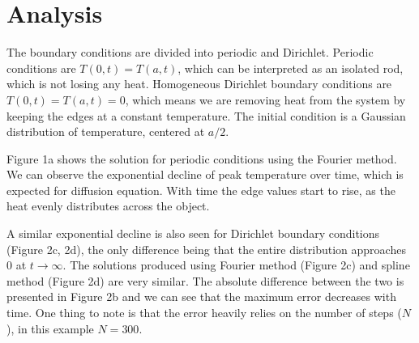\documentclass[12pt, a4paper]{article}
\begin{document}
\section{Analysis}

The boundary conditions are divided into periodic and Dirichlet. Periodic conditions are $T(0,t) = T(a, t)$, which can be interpreted as an isolated rod, which is not losing any heat. Homogeneous Dirichlet boundary conditions are $T(0,t) = T(a, t) = 0$, which means we are removing heat from the system by keeping the edges at a constant temperature. The initial condition is a Gaussian distribution of temperature, centered at $a/2$.

Figure 1a shows the solution for periodic conditions using the Fourier method. We can observe the exponential decline of peak temperature over time, which is expected for diffusion equation. With time the edge values start to rise, as the heat evenly distributes across the object.

A similar exponential decline is also seen for Dirichlet boundary conditions (Figure 2c, 2d), the only difference being that the entire distribution approaches $0$ at $t \rightarrow \infty$. The solutions produced using Fourier method (Figure 2c) and spline method (Figure 2d) are very similar. The absolute difference between the two is presented in Figure 2b and we can see that the maximum error decreases with time. One thing to note is that the error heavily relies on the number of steps ($N$), in this example $N = 300$.
\end{document}
